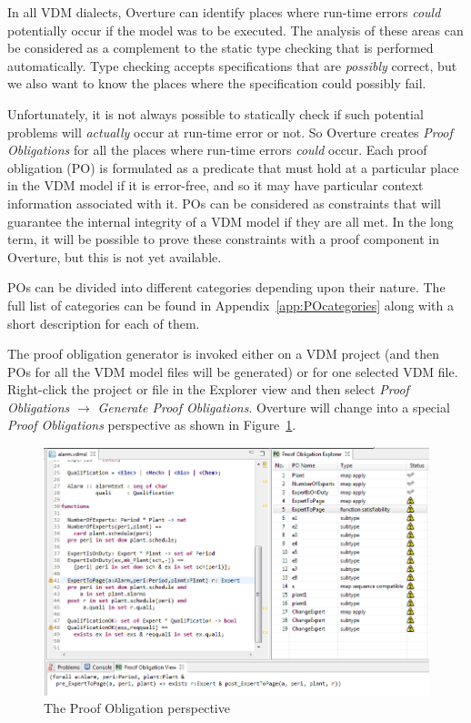 \documentclass{overturerepchap}
\begin{document}
In all VDM dialects, Overture can identify places where run-time errors
\emph{could} potentially occur if the model was to be executed. The analysis of
these areas can be considered
as a complement to the static type checking that is performed automatically.
Type checking accepts specifications that are \emph{possibly} correct, but
we also want to know the places where the specification could possibly fail.

Unfortunately, it is not always possible to statically check if such
potential problems will \emph{actually} occur at run-time error or not. So Overture
creates \emph{Proof Obligations} for all the places
where run-time errors \emph{could} occur. Each proof obligation (PO)
is formulated as a predicate that must hold at a particular place in the VDM
model if it is error-free, and so it may have particular context information
associated with it. POs can be considered as
constraints that will guarantee the internal integrity of a VDM model if they
are all met. In the long term, it will be possible to prove these constraints
with a proof component in Overture, but this is not yet available.

POs can be divided into different categories
depending upon their nature. The full list of categories can be found in
Appendix~\ref{app:POcategories} along with a short description for
each of them.

The proof obligation generator is invoked either on a VDM project (and
then POs for all the VDM model files will be generated) or for one
selected VDM file. Right-click the project or file in the Explorer view and
then select \emph{Proof Obligations} $\rightarrow$ \emph{Generate Proof
  Obligations}. Overture will change into a special
\emph{Proof Obligations} perspective as shown in
Figure~\ref{fig:POView}.

\begin{figure}[htbp]
\begin{center}
\includegraphics[width=\textwidth]{figures/POView}
\caption{The Proof Obligation perspective\label{fig:POView}}
\end{center}
\end{figure}
\end{document}
